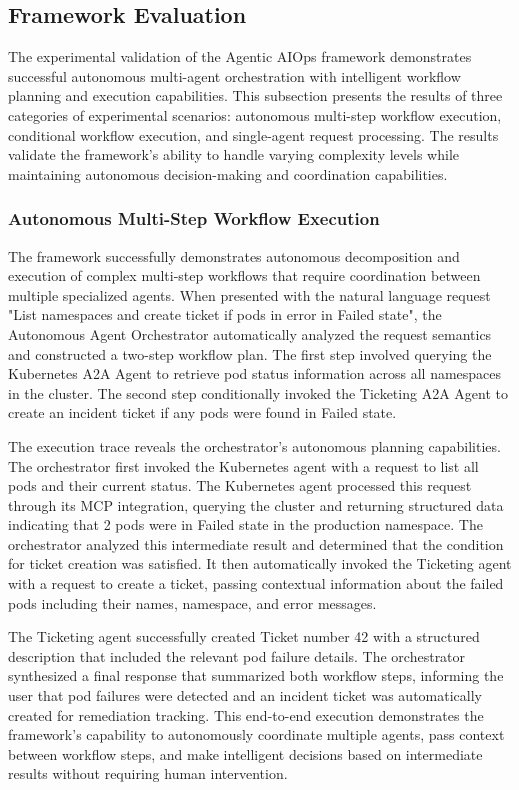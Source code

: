 \documentclass{article}
\begin{document}
\subsection{Framework Evaluation}

The experimental validation of the Agentic AIOps framework demonstrates successful autonomous multi-agent orchestration with intelligent workflow planning and execution capabilities. This subsection presents the results of three categories of experimental scenarios: autonomous multi-step workflow execution, conditional workflow execution, and single-agent request processing. The results validate the framework's ability to handle varying complexity levels while maintaining autonomous decision-making and coordination capabilities.

\subsubsection{Autonomous Multi-Step Workflow Execution}

The framework successfully demonstrates autonomous decomposition and execution of complex multi-step workflows that require coordination between multiple specialized agents. When presented with the natural language request "List namespaces and create ticket if pods in error in Failed state", the Autonomous Agent Orchestrator automatically analyzed the request semantics and constructed a two-step workflow plan. The first step involved querying the Kubernetes A2A Agent to retrieve pod status information across all namespaces in the cluster. The second step conditionally invoked the Ticketing A2A Agent to create an incident ticket if any pods were found in Failed state.

The execution trace reveals the orchestrator's autonomous planning capabilities. The orchestrator first invoked the Kubernetes agent with a request to list all pods and their current status. The Kubernetes agent processed this request through its MCP integration, querying the cluster and returning structured data indicating that 2 pods were in Failed state in the production namespace. The orchestrator analyzed this intermediate result and determined that the condition for ticket creation was satisfied. It then automatically invoked the Ticketing agent with a request to create a ticket, passing contextual information about the failed pods including their names, namespace, and error messages.

The Ticketing agent successfully created Ticket number 42 with a structured description that included the relevant pod failure details. The orchestrator synthesized a final response that summarized both workflow steps, informing the user that pod failures were detected and an incident ticket was automatically created for remediation tracking. This end-to-end execution demonstrates the framework's capability to autonomously coordinate multiple agents, pass context between workflow steps, and make intelligent decisions based on intermediate results without requiring human intervention.
\end{document}
